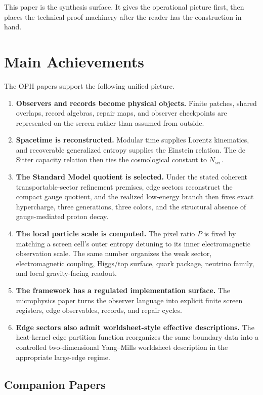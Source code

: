 \documentclass[11pt]{article}
\begin{document}
This paper is the synthesis surface. It gives the operational picture first, then places the
technical proof machinery after the reader has the construction in hand.

\section{Main Achievements}

The OPH papers support the following unified picture.

\begin{enumerate}[leftmargin=2em]
\item \textbf{Observers and records become physical objects.} Finite patches, shared overlaps,
record algebras, repair maps, and observer checkpoints are represented on the screen rather than
assumed from outside.
\item \textbf{Spacetime is reconstructed.} Modular time supplies Lorentz kinematics, and
recoverable generalized entropy supplies the Einstein relation. The de Sitter capacity relation
then ties the cosmological constant to \(N_{\mathrm{scr}}\).
\item \textbf{The Standard Model quotient is selected.} Under the stated coherent transportable-sector
refinement premises, edge sectors reconstruct the compact gauge quotient, and the realized low-energy branch
then fixes exact hypercharge, three generations, three colors, and the structural absence of
gauge-mediated proton decay.
\item \textbf{The local particle scale is computed.} The pixel ratio \(P\) is fixed by matching a
screen cell's outer entropy detuning to its inner electromagnetic observation scale. The same
number organizes the weak sector, electromagnetic coupling, Higgs/top surface, quark package,
neutrino family, and local gravity-facing readout.
\item \textbf{The framework has a regulated implementation surface.} The microphysics paper turns
the observer language into explicit finite screen registers, edge observables, records, and repair
cycles.
\item \textbf{Edge sectors also admit worldsheet-style effective descriptions.} The heat-kernel
edge partition function reorganizes the same boundary data into a controlled two-dimensional
Yang--Mills worldsheet description in the appropriate large-edge regime.
\end{enumerate}

\subsection*{Companion Papers}
\end{document}
